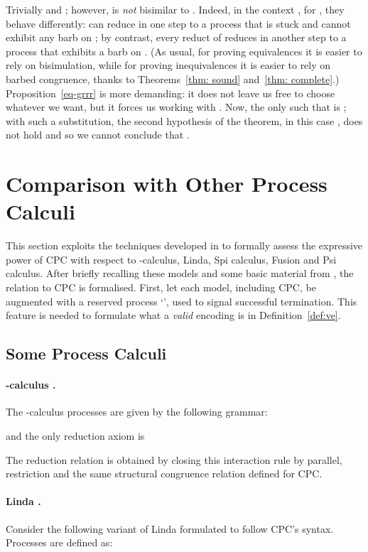 \documentclass{LMCS}
\begin{document}
Trivially  and ;
however,  is {\em not} bisimilar to . Indeed, in the context ,
for , they behave differently:  can reduce in one step to a process that is stuck and cannot
exhibit any barb on ; by contrast, every reduct of  reduces in another step to a process that exhibits
a barb on . (As usual, for proving equivalences it is easier to rely on bisimulation, while for proving
inequivalences it is easier to rely on barbed congruence, thanks to Theorems~\ref{thm: sound} and~\ref{thm: complete}.)
Proposition~\ref{eq-grrr} is more demanding: it does not leave us free to choose whatever  we want, but
it forces us working with . Now, the only  such that 
is ; with such a substitution, the second hypothesis of the theorem, in this case , does not hold
and so we cannot conclude that .


\section{Comparison with Other Process Calculi}
\label{sec:compare}

This section exploits the techniques developed in \cite{G:IC08,G:CONCUR08} to formally
assess the expressive power of CPC with respect to -calculus, Linda, Spi calculus, Fusion and Psi calculus.
After briefly recalling these models and some basic material from \cite{G:CONCUR08}, the 
relation to CPC is formalised. First, let each model, including CPC, be augmented with
a reserved process `', used to signal successful termination.
This feature is needed to formulate what a {\em valid} encoding is in Definition~\ref{def:ve}.


\subsection{Some Process Calculi}
\label{subsec:calculi}

\paragraph{-calculus \cite{milner.parrow.ea:calculus-mobile,sangiorgi.walker:theory-mobile}.}
The -calculus processes are given by the following grammar:

and the only reduction axiom is

The reduction relation is obtained by closing this interaction rule by parallel, restriction and the
same structural congruence relation defined for CPC.

\paragraph{Linda \cite{Gel85}.} Consider the following variant of Linda formulated to follow 
CPC's syntax. Processes are defined as:
\end{document}
